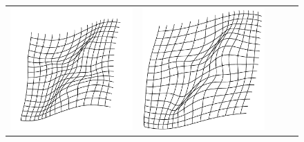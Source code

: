 \begin{figure}[!tb]
\begin{tabular}{c@{}c@{}c@{}c@{}c}
  \includegraphics[scale=0.18,trim={5ex 5ex 5ex 5ex},clip=false]{ScriptedImages/elastix_BS_NCC_Displacement.pdf}&
  \includegraphics[scale=0.18,trim={5ex 5ex 5ex 5ex},clip=true]{ScriptedImages/elastix_BS_MSD_Displacement.pdf}&

\end{tabular}
\end{figure}
